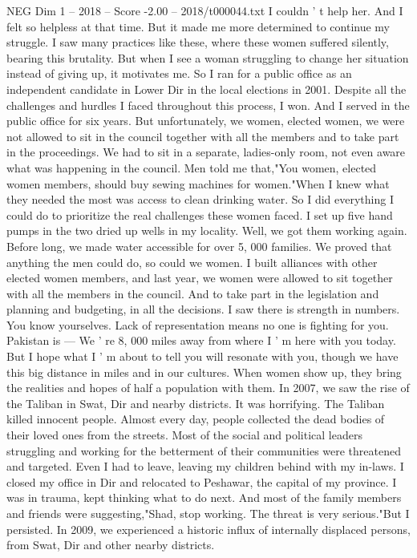 \begin{textsample}{NEG Dim 1 – 2018 – Score -2.00 – 2018/t000044.txt}
I couldn ' t help her.
And I felt so helpless at that time.
But it made me more determined to continue my struggle.
I saw many practices like these, where these women suffered silently, bearing this brutality.
But when I see a woman struggling to change her situation instead of giving up, it motivates me.
So I ran for a public office as an independent candidate in Lower Dir in the local elections in 2001.
Despite all the challenges and hurdles I faced throughout this process, I won.
And I served in the public office for six years.
But unfortunately, we women, elected women, we were not allowed to sit in the council together with all the members and to take part in the proceedings.
We had to sit in a separate, ladies-only room, not even aware what was happening in the council.
Men told me that,"You women, elected women members, should buy sewing machines for women."When I knew what they needed the most was access to clean drinking water.
So I did everything I could do to prioritize the real challenges these women faced.
I set up five hand pumps in the two dried up wells in my locality.
Well, we got them working again.
Before long, we made water accessible for over 5, 000 families.
We proved that anything the men could do, so could we women.
I built alliances with other elected women members, and last year, we women were allowed to sit together with all the members in the council.
And to take part in the legislation and planning and budgeting, in all the decisions.
I saw there is strength in numbers.
You know yourselves.
Lack of representation means no one is fighting for you.
Pakistan is — We ' re 8, 000 miles away from where I ' m here with you today.
But I hope what I ' m about to tell you will resonate with you, though we have this big distance in miles and in our cultures.
When women show up, they bring the realities and hopes of half a population with them.
In 2007, we saw the rise of the Taliban in Swat, Dir and nearby districts.
It was horrifying.
The Taliban killed innocent people.
Almost every day, people collected the dead bodies of their loved ones from the streets.
Most of the social and political leaders struggling and working for the betterment of their communities were threatened and targeted.
Even I had to leave, leaving my children behind with my in-laws.
I closed my office in Dir and relocated to Peshawar, the capital of my province.
I was in trauma, kept thinking what to do next.
And most of the family members and friends were suggesting,"Shad, stop working.
The threat is very serious."But I persisted.
In 2009, we experienced a historic influx of internally displaced persons, from Swat, Dir and other nearby districts.

\end{textsample}
